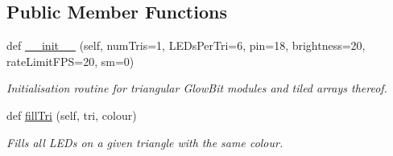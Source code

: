 \subsection*{Public Member Functions}
\begin{DoxyCompactItemize}
\item 
def \hyperlink{classglowbit_1_1triangle_aa9ff905dd6cde53bf8a39b3f8cb9482f}{\+\_\+\+\_\+init\+\_\+\+\_\+} (self, num\+Tris=1, L\+E\+Ds\+Per\+Tri=6, pin=18, brightness=20, rate\+Limit\+F\+PS=20, sm=0)
\begin{DoxyCompactList}\small\item\em Initialisation routine for triangular Glow\+Bit modules and tiled arrays thereof. \end{DoxyCompactList}\item 
def \hyperlink{classglowbit_1_1triangle_a26f35bf61d507d755ce039f4a0210c08}{fill\+Tri} (self, tri, colour)
\begin{DoxyCompactList}\small\item\em Fills all L\+E\+Ds on a given triangle with the same colour. \end{DoxyCompactList}\end{DoxyCompactItemize}
